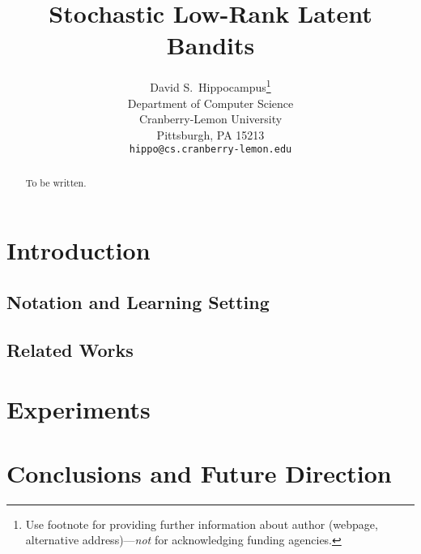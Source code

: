 \documentclass{article}
\title{Stochastic Low-Rank Latent Bandits}
\author{
  David S.~Hippocampus\thanks{Use footnote for providing further
    information about author (webpage, alternative
    address)---\emph{not} for acknowledging funding agencies.} \\
  Department of Computer Science\\
  Cranberry-Lemon University\\
  Pittsburgh, PA 15213 \\
  \texttt{hippo@cs.cranberry-lemon.edu} \\
}
\begin{document}

\maketitle

\begin{abstract}
To be written.
\end{abstract}


\section{Introduction}
\label{sec:introduction}



\subsection{Notation and Learning Setting}
\label{se:setting}


%

\subsection{Related Works}
\label{sec:related}






\newpage
\section{Experiments}




\section{Conclusions and Future Direction}



%



\newpage

\appendix


\end{document}
